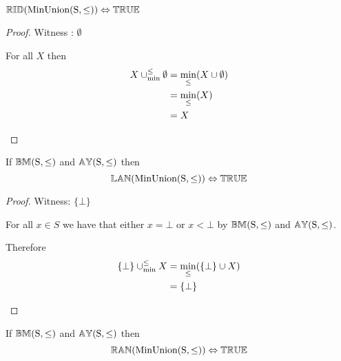 \begin{theorem} \label{thm:minunion_rid}
${\mathbb{RID}}(\mathrm{MinUnion(S,\leq)}) \Leftrightarrow {\mathbb{TRUE}}$
\end{theorem}

\begin{proof}

\vspace{0.5em}

Witness : $\emptyset$
\begin{ind}
For all $X$ then
\begin{align*}
X \mathbin{\cup_{\min}^{\leq}} \emptyset 	& = \min_\leq(X \cup \emptyset) \\
						& = \min_\leq(X) \\
						& = X
\end{align*}
\end{ind}
\end{proof}






\begin{theorem} \label{thm:minunion_lan}
If ${\mathbb{BM}}(\mathrm{S,\leq})$ and ${\mathbb{AY}}(\mathrm{S,\leq})$ then
\begin{equation*}
{\mathbb{LAN}}(\mathrm{MinUnion(S,\leq)}) \Leftrightarrow {\mathbb{TRUE}}
\end{equation*}
\end{theorem}

\begin{proof}

\vspace{0.5em}

Witness: $\{\bot\}$
\begin{ind}
For all $x \in S$ we have that either $x = \bot$ or $x < \bot$ by ${\mathbb{BM}}(\mathrm{S,\leq})$ and ${\mathbb{AY}}(\mathrm{S,\leq})$.

\vspace{0.5em}

Therefore
\begin{align*}
\{\bot\} \mathbin{\cup_{\min}^{\leq}} X 	& = \min_\leq(\{\bot\} \cup X) \\
						& = \{\bot\}
\end{align*}
\end{ind}
\end{proof}






\begin{theorem} \label{thm:minunion_ran}
If ${\mathbb{BM}}(\mathrm{S,\leq})$ and ${\mathbb{AY}}(\mathrm{S,\leq})$ then
\begin{equation*}
{\mathbb{RAN}}(\mathrm{MinUnion(S,\leq)}) \Leftrightarrow {\mathbb{TRUE}}
\end{equation*}
\end{theorem}

